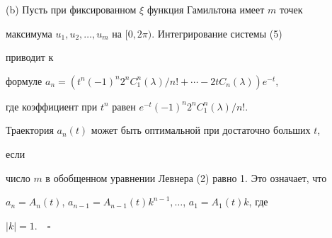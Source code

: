  


(b) Пусть при фиксированном $\xi$ функция Гамильтона имеет $m$ точек 


максимума $u_1,u_2,\dotsc,u_m$ на $[0,2\pi)$. Интегрирование системы (5) 


приводит к 


формуле $a_n=(t^n(-1)^n2^nC^n_1(\lambda)/n!+\dotsb-2t 


C_n(\lambda))e^{-t}$, 


где коэффициент при $t^n$ равен $e^{-t}(-1)^n2^n C^n_1(\lambda)/n!$. 


 


Траектория $a_n(t)$ может быть оптимальной при достаточно больших $t$, 


если 


число $m$ в обобщенном уравнении Левнера (2) равно 1. Это означает, что 


$a_n=A_n(t)$, $a_{n-1}=A_{n-1}(t)k^{n-1},\dotsc$, $a_1=A_1(t)k$, где 


$|k|=1$.$\quad\square$ 


 


